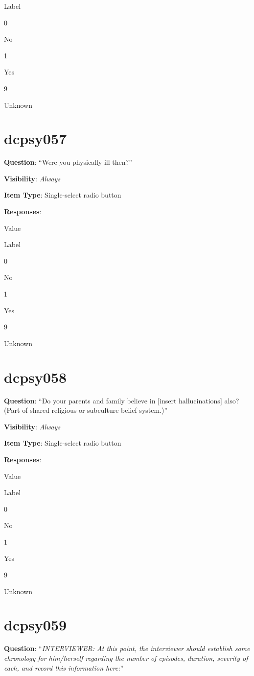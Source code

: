 \documentclass[]{book}
\begin{document}
Label

0

No

1

Yes

9

Unknown

\hypertarget{dcpsy057}{%
\section{dcpsy057}\label{dcpsy057}}

\textbf{Question}: ``Were you physically ill then?''

\textbf{Visibility}: \emph{Always}

\textbf{Item Type}: Single-select radio button

\textbf{Responses}:

Value

Label

0

No

1

Yes

9

Unknown

\hypertarget{dcpsy058}{%
\section{dcpsy058}\label{dcpsy058}}

\textbf{Question}: ``Do your parents and family believe in {[}insert hallucinations{]} also? (Part of shared religious or subculture belief system.)''

\textbf{Visibility}: \emph{Always}

\textbf{Item Type}: Single-select radio button

\textbf{Responses}:

Value

Label

0

No

1

Yes

9

Unknown

\hypertarget{dcpsy059}{%
\section{dcpsy059}\label{dcpsy059}}

\textbf{Question}: ``\emph{INTERVIEWER: At this point, the interviewer should establish some chronology for him/herself regarding the number of episodes, duration, severity of each, and record this information here:}''
\end{document}
